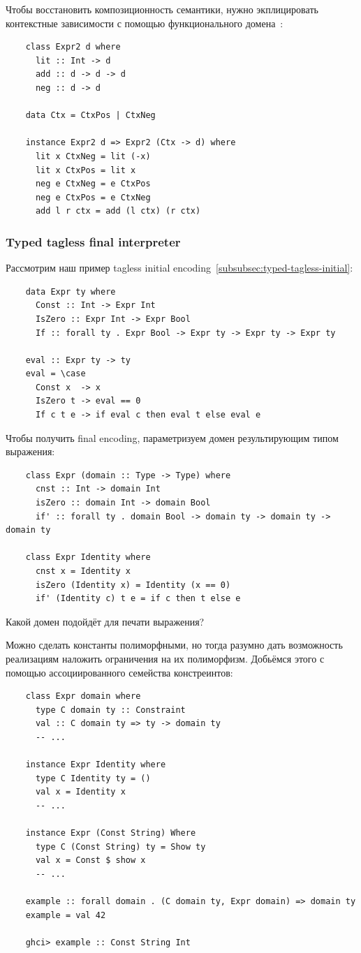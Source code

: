 Чтобы восстановить композиционность семантики, нужно экплицировать контекстные зависимости с помощью функционального домена~\cite{kiselyov2012typed}:
\begin{verbatim}
    class Expr2 d where
      lit :: Int -> d
      add :: d -> d -> d
      neg :: d -> d

    data Ctx = CtxPos | CtxNeg

    instance Expr2 d => Expr2 (Ctx -> d) where
      lit x CtxNeg = lit (-x)
      lit x CtxPos = lit x
      neg e CtxNeg = e CtxPos
      neg e CtxPos = e CtxNeg
      add l r ctx = add (l ctx) (r ctx)
\end{verbatim}

\subsubsection{Typed tagless final interpreter}

Рассмотрим наш пример tagless initial encoding~\ref{subsubsec:typed-tagless-initial}:
\begin{verbatim}
    data Expr ty where
      Const :: Int -> Expr Int
      IsZero :: Expr Int -> Expr Bool
      If :: forall ty . Expr Bool -> Expr ty -> Expr ty -> Expr ty

    eval :: Expr ty -> ty
    eval = \case
      Const x  -> x
      IsZero t -> eval == 0
      If c t e -> if eval c then eval t else eval e
\end{verbatim}
Чтобы получить final encoding, параметризуем домен результирующим типом выражения:
\begin{verbatim}
    class Expr (domain :: Type -> Type) where
      cnst :: Int -> domain Int
      isZero :: domain Int -> domain Bool
      if' :: forall ty . domain Bool -> domain ty -> domain ty -> domain ty

    class Expr Identity where
      cnst x = Identity x
      isZero (Identity x) = Identity (x == 0)
      if' (Identity c) t e = if c then t else e
\end{verbatim}

\begin{task}
    Какой домен подойдёт для печати выражения?
\end{task}

Можно сделать константы полиморфными, но тогда разумно дать возможность реализациям наложить ограничения на их полиморфизм.
Добьёмся этого с помощью ассоциированного семейства констреинтов:
\begin{verbatim}
    class Expr domain where
      type C domain ty :: Constraint
      val :: C domain ty => ty -> domain ty
      -- ...

    instance Expr Identity where
      type C Identity ty = ()
      val x = Identity x
      -- ...

    instance Expr (Const String) Where
      type C (Const String) ty = Show ty
      val x = Const $ show x
      -- ...

    example :: forall domain . (C domain ty, Expr domain) => domain ty
    example = val 42

    ghci> example :: Const String Int
\end{verbatim}


